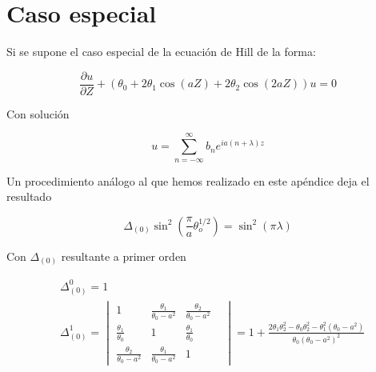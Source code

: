 \section{Caso especial}

Si se supone el caso especial de la ecuación de Hill de la forma:

\begin{equation}
    \frac{\partial u}{\partial Z}+\left(\theta_0+2\theta_1\cos(aZ)+2\theta_2\cos(2aZ)\right)u=0
\end{equation}

Con solución

\begin{equation}
    u=\sum^{\infty}_{n=-\infty} b_n e^{ia(n+\lambda)z}
\end{equation}

Un procedimiento análogo al que hemos realizado en este apéndice deja el resultado

\begin{equation}
\Delta_{(0)}\sin^2(\frac{\pi}{a}\theta_o^{1/2})=\sin^2(\pi\lambda)
\end{equation}

Con $\Delta_{(0)}$ resultante a primer orden

\begin{equation}
\begin{aligned}
& \Delta_{(0)}^0=1 \\
& \Delta_{(0)}^1=
\begin{vmatrix}
 1 & \frac{\theta_1}{\theta_0-a^2} & \frac{\theta_2}{\theta_0-a^2} \\ 
 \frac{\theta_1}{\theta_0} & 1 & \frac{\theta_1}{\theta_0}  \\
 \frac{\theta_2}{\theta_0-a^2} & \frac{\theta_1}{\theta_0-a^2} & 1 &  
\end{vmatrix}
= 1+\frac{2\theta_1\theta_2^2-\theta_0\theta_2^2-\theta_1^2(\theta_0-a^2)}{\theta_0(\theta_0-a^2)^2}
\end{aligned}
\end{equation}



